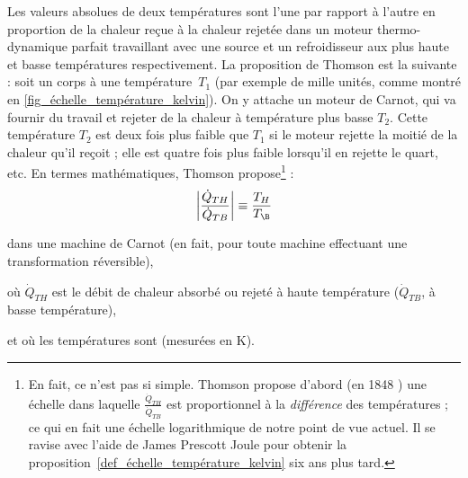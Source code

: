 			Les valeurs absolues de deux températures sont l’une par rapport à l’autre en proportion de la chaleur reçue à la chaleur rejetée dans un moteur thermo-dynamique parfait travaillant avec une source et un refroidisseur aux plus haute et basse températures respectivement.
		La proposition de Thomson est la suivante : soit un corps à une température~$T_1$ (par exemple de mille unités, comme montré en \cref{fig_échelle_température_kelvin}). On y attache un moteur de Carnot, qui va fournir du travail et rejeter de la chaleur à température plus basse $T_2$. Cette température $T_2$ est deux fois plus faible que $T_1$ si le moteur rejette la moitié de la chaleur qu’il reçoit ; elle est quatre fois plus faible lorsqu’il en rejette le quart, etc. En termes mathématiques, Thomson propose\footnote{En fait, ce n’est pas si simple. Thomson propose d’abord (en 1848 \cite{kelvin1848}) une échelle dans laquelle $\frac{\dot Q_{TH}}{\dot Q_{TB}}$ est proportionnel à la \emph{différence} des températures ; ce qui en fait une échelle logarithmique de notre point de vue actuel. Il se ravise avec l’aide de James Prescott Joule pour obtenir la proposition~\ref{def_échelle_température_kelvin} six ans plus tard.} :%
		\begin{equation}
			\left| \frac{\dot Q_{TH}}{\dot Q_{TB}} \right| \equiv  \frac{T_H}{T_\B }
			\label{def_échelle_température_kelvin}
		\end{equation}
		\begin{equationterms}
			\item dans une machine de Carnot (en fait, pour toute machine effectuant une transformation réversible),
			\item où \tab $\dot Q_{TH}$ \tab est le débit de chaleur absorbé ou rejeté à haute température ($\dot Q_{TB}$, à basse température),
			\item et où les températures sont  (mesurées en \si{\kelvin}).
		\end{equationterms}


